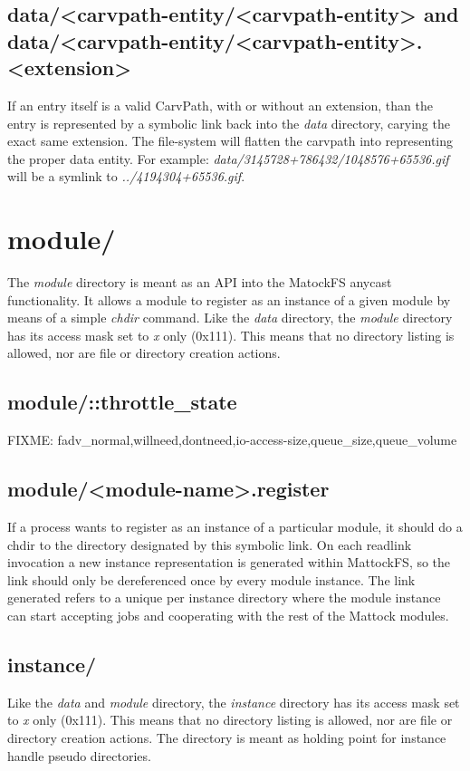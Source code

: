 \subsection{data/<carvpath-entity/<carvpath-entity> and data/<carvpath-entity/<carvpath-entity>.<extension>}
If an entry itself is a valid CarvPath, with or without an extension, than the entry is represented by a symbolic link back into the \emph{data} directory, carying the exact same extension. The file-system will flatten the carvpath into representing the proper data entity. For example: \emph{data/3145728+786432/1048576+65536.gif} will be a symlink to \emph{../4194304+65536.gif}.
\section{module/}
The \emph{module} directory is meant as an API into the MatockFS anycast functionality. It allows a module to register as an instance of a given module by means of a simple \emph{chdir} command. Like the \emph{data} directory, the \emph{module} directory has its access mask set to \emph{x} only (0x111). This means that no directory listing is allowed, nor are file or directory creation actions.  
\subsection{module/::throttle\_state}
FIXME: fadv\_normal,willneed,dontneed,io-access-size,queue\_size,queue\_volume
\subsection{module/<module-name>.register}
If a process wants to register as an instance of a particular module, it should do a chdir to the directory designated by this symbolic link. On each readlink invocation a new instance representation is generated within MattockFS, so the link should only be dereferenced once by every module instance. The link generated refers to a unique per instance directory where the module instance can start accepting jobs and cooperating with the rest of the Mattock modules.
\subsection{instance/}
Like the \emph{data} and \emph{module} directory, the \emph{instance} directory  has its access mask set to \emph{x} only (0x111). This means that no directory listing is allowed, nor are file or directory creation actions. The directory is meant as holding point for instance handle pseudo directories.
